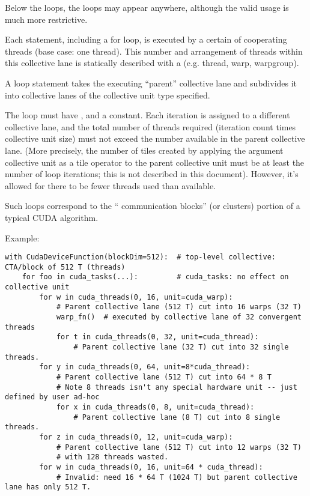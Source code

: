 \filbreak
{} Below the  loops, the  loops may appear anywhere, although the valid usage is much more restrictive.

Each statement, including a for loop, is executed by a certain  of cooperating threads (base case: one thread).
This number and arrangement of threads within this collective lane is statically described with a  (e.g. thread, warp, warpgroup).

\filbreak
A  loop statement takes the executing ``parent'' collective lane and subdivides it into collective lanes of the collective unit type specified.

\filbreak
The loop must have , and  a constant.
Each iteration is assigned to a different collective lane, and the total number of threads required (iteration count times collective unit size) must not exceed the number available in the parent collective lane.
(More precisely, the number of tiles created by applying the argument collective unit as a tile operator to the parent collective unit must be at least the number of loop iterations; this is not described in this document).
However, it's allowed for there to be fewer threads used than available.

\filbreak
Such loops correspond to the `` communication  blocks'' (or clusters) portion of a typical CUDA algorithm.

\filbreak
Example:
{\color{lightttColor}
\begin{verbatim}
with CudaDeviceFunction(blockDim=512):  # top-level collective: CTA/block of 512 T (threads)
    for foo in cuda_tasks(...):         # cuda_tasks: no effect on collective unit
        for w in cuda_threads(0, 16, unit=cuda_warp):
            # Parent collective lane (512 T) cut into 16 warps (32 T)
            warp_fn()  # executed by collective lane of 32 convergent threads
            for t in cuda_threads(0, 32, unit=cuda_thread):
                # Parent collective lane (32 T) cut into 32 single threads.
        for y in cuda_threads(0, 64, unit=8*cuda_thread):
            # Parent collective lane (512 T) cut into 64 * 8 T
            # Note 8 threads isn't any special hardware unit -- just defined by user ad-hoc
            for x in cuda_threads(0, 8, unit=cuda_thread):
                # Parent collective lane (8 T) cut into 8 single threads.
        for z in cuda_threads(0, 12, unit=cuda_warp):
            # Parent collective lane (512 T) cut into 12 warps (32 T)
            # with 128 threads wasted.
        for w in cuda_threads(0, 16, unit=64 * cuda_thread):
            # Invalid: need 16 * 64 T (1024 T) but parent collective lane has only 512 T.
\end{verbatim}
}

